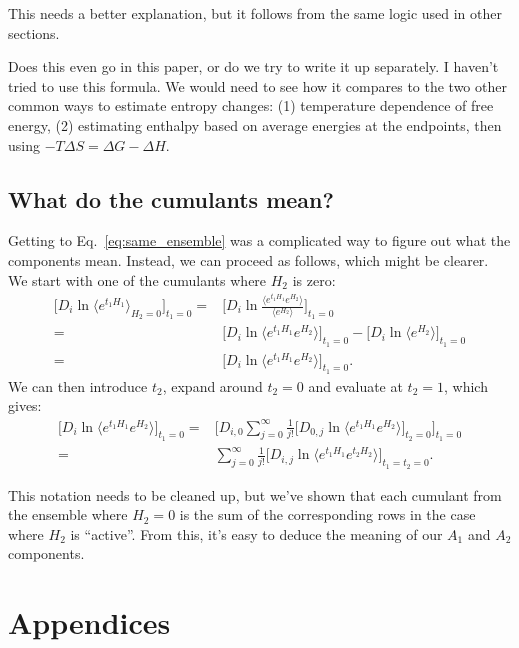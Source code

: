 \documentclass{article}
\begin{document}
This needs a better explanation, but it follows from the same logic used in other sections.

Does this even go in this paper, or do we try to write it up separately. I haven't tried to use this formula. We would need to see how it compares to the two other common ways to estimate entropy changes: (1) temperature dependence of free energy, (2) estimating enthalpy based on average energies at the endpoints, then using $-T \Delta S = \Delta G - \Delta H$.

\subsection*{What do the cumulants mean?}

Getting to Eq.~\ref{eq:same_ensemble} was a complicated way to figure out what the components mean. Instead, we can proceed as follows, which might be clearer. We start with one of the cumulants where $H_2$ is zero:
\begin{align}
\Bigg[ D_i \ln \langle e^{t_1 H_1} \rangle_{H_2=0} \Bigg]_{t_1=0} =&
	\Bigg[ D_i \ln \frac{\langle e^{t_1 H_1} e^{H_2} \rangle}{\langle e^{H_2} \rangle} \Bigg]_{t_1=0} \\
	= &
		\Bigg[ D_i \ln \langle e^{t_1 H_1} e^{H_2} \rangle \Bigg]_{t_1=0}  -
		\Bigg[ D_i \ln {\langle e^{H_2} \rangle} \Bigg]_{t_1=0} \\
	= &
		\Bigg[ D_i \ln \langle e^{t_1 H_1} e^{H_2} \rangle \Bigg]_{t_1=0}.
\end{align}
We can then introduce $t_2$, expand around $t_2=0$ and evaluate at $t_2=1$, which gives:
\begin{align}
\Bigg[ D_i \ln \langle e^{t_1 H_1} e^{H_2} \rangle \Bigg]_{t_1=0} =&
	\Bigg[ D_{i,0} \sum_{j=0}^\infty \frac{1}{j!} \Bigg[
		D_{0,j} \ln \langle e^{t_1 H_1} e^{H_2} \rangle
	\Bigg]_{t_2=0}
\Bigg]_{t_1=0} \\
=&
\sum_{j=0}^\infty \frac{1}{j!}
\Bigg[
	D_{i,j} \ln \langle e^{t_1 H_1} e^{t_2 H_2} \rangle
\Bigg]_{t_1=t_2=0}.
\end{align}

This notation needs to be cleaned up, but we've shown that each cumulant from the ensemble where $H_2=0$ is the sum of the corresponding rows in the case where $H_2$ is ``active''. From this, it's easy to deduce the meaning of our $A_1$ and $A_2$ components.


\section*{Appendices}
\end{document}
